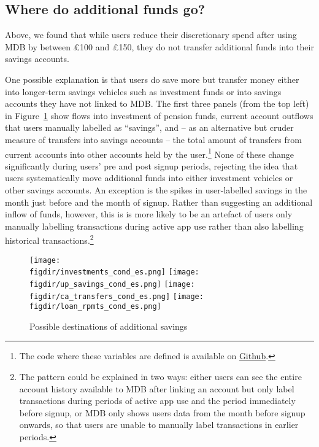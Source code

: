 \subsection{Where do additional funds go?}%
\label{sub:where_do_additional_funds_go_}

Above, we found that while users reduce their discretionary spend after using
MDB by between \pounds100 and \pounds150, they do not transfer additional funds
into their savings accounts.

One possible explanation is that users do save more but transfer money either
into longer-term savings vehicles such as investment funds or into savings
accounts they have not linked to MDB. The first three panels (from the top
left) in Figure~\ref{fig:wdmg} show flows into investment of pension funds,
current account outflows that users manually labelled as ``savings'', and -- as
an alternative but cruder measure of transfers into savings accounts -- the
total amount of transfers from current accounts into other accounts held by the
user.\footnote{The code where these variables are defined is available on
\href{https://github.com/fabiangunzinger/mdb_eval/blob/f31bfcd7a330188cdd27968d41957ebf5b454099/src/data/aggregators.py\#L300}{Github}.}
None of these change significantly during users' pre and post signup periods,
rejecting the idea that users systematically move additional funds into either
investment vehicles or other savings accounts. An exception is the spikes in
user-labelled savings in the month just before and the month of signup. Rather
than suggesting an additional inflow of funds, however, this is is more likely
to be an artefact of users only manually labelling transactions during active
app use rather than also labelling historical transactions.\footnote{The pattern
    could be explained in two ways: either users can see the entire account
    history available to MDB after linking an account but only label
    transactions during periods of active app use and the period immediately
before signup, or MDB only shows users data from the month before signup
onwards, so that users are unable to manually label transactions in earlier
periods.}

\begin{figure}[h]
    \centering
    \caption{Possible destinations of additional savings}%
    \label{fig:wdmg}
    \texttt{[image: \\figdir/investments\_cond\_es.png]}
    \texttt{[image: \\figdir/up\_savings\_cond\_es.png]}
    \texttt{[image: \\figdir/ca\_transfers\_cond\_es.png]}
    \texttt{[image: \\figdir/loan\_rpmts\_cond\_es.png]}
\end{figure}


